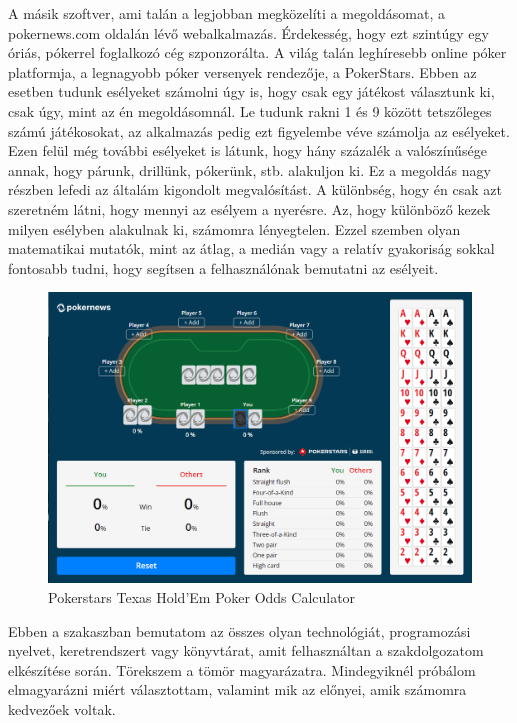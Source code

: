 A másik szoftver, ami talán a legjobban megközelíti a megoldásomat, a pokernews.com oldalán lévő webalkalmazás. Érdekesség, hogy ezt szintúgy egy óriás, pókerrel foglalkozó cég szponzorálta. A világ talán leghíresebb online póker platformja, a legnagyobb póker versenyek rendezője, a PokerStars. Ebben az esetben tudunk esélyeket számolni úgy is, hogy csak egy játékost választunk ki, csak úgy, mint az én megoldásomnál. Le tudunk rakni 1 és 9 között tetszőleges számú játékosokat, az alkalmazás pedig ezt figyelembe véve számolja az esélyeket. Ezen felül még további esélyeket is látunk, hogy hány százalék a valószínűsége annak, hogy párunk, drillünk, pókerünk, stb. alakuljon ki. Ez a megoldás nagy részben lefedi az általám kigondolt megvalósítást. A különbség, hogy én csak azt szeretném látni, hogy mennyi az esélyem a nyerésre. Az, hogy különböző kezek milyen esélyben alakulnak ki, számomra lényegtelen. Ezzel szemben olyan matematikai mutatók, mint az átlag, a medián vagy a relatív gyakoriság sokkal fontosabb tudni, hogy segítsen a felhasználónak bemutatni az esélyeit.
\begin{figure}[h!]
\centering
\includegraphics[scale=0.5]{images/pokerstars.png}
\caption{Pokerstars Texas Hold'Em Poker Odds Calculator}
\label{fig:pokerstars}
\end{figure}

\cite{cardschat}
\cite{pokerstars}
\cite{harrington} %

Ebben a szakaszban bemutatom az összes olyan technológiát, programozási nyelvet, keretrendszert vagy könyvtárat, amit felhasználtan a szakdolgozatom elkészítése során. Törekszem a tömör magyarázatra. Mindegyiknél próbálom elmagyarázni miért választottam, valamint mik az előnyei, amik számomra kedvezőek voltak.

